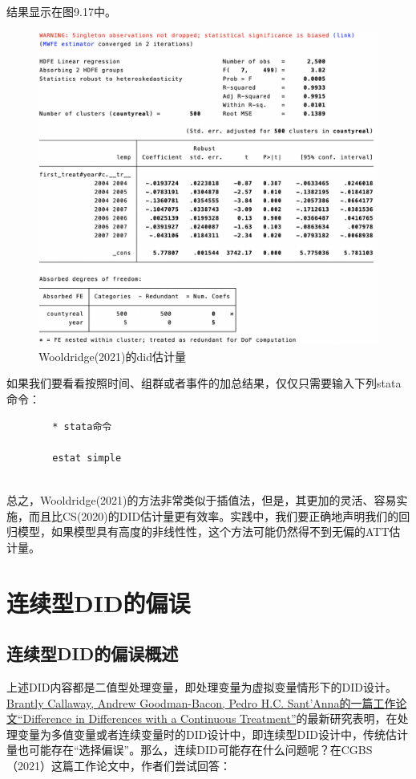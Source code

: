 \documentclass[cn,12pt,math=newtx,citestyle=gb7714-2015,bibstyle=gb7714-2015]{elegantbook}
\begin{document}
    结果显示在图9.17中。
	
	\begin{figure}[tbph]
		\centering
		\includegraphics[width=1\linewidth]{jwdid}
		\caption{Wooldridge(2021)的did估计量}
		\label{fig:jwdid}
	\end{figure}

    如果我们要看看按照时间、组群或者事件的加总结果，仅仅只需要输入下列stata命令：
    
    \begin{lstlisting}
    	* stata命令
    
    	estat simple
    	
    \end{lstlisting}

    总之，Wooldridge(2021)的方法非常类似于插值法，但是，其更加的灵活、容易实施，而且比CS(2020)的DID估计量更有效率。实践中，我们要正确地声明我们的回归模型，如果模型具有高度的非线性性，这个方法可能仍然得不到无偏的ATT估计量。

  \section{连续型DID的偏误}
  
  \subsection{连续型DID的偏误概述}
  上述DID内容都是二值型处理变量，即处理变量为虚拟变量情形下的DID设计。\href{https://arxiv.org/abs/2107.02637}{Brantly Callaway, Andrew Goodman-Bacon, Pedro H.C. Sant'Anna的一篇工作论文“Difference in Differences with a Continuous Treatment”}的最新研究表明，在处理变量为多值变量或者连续变量时的DID设计中，即连续型DID设计中，传统估计量也可能存在“选择偏误”。那么，连续DID可能存在什么问题呢？在CGBS（2021）这篇工作论文中，作者们尝试回答：
  
\end{document}
